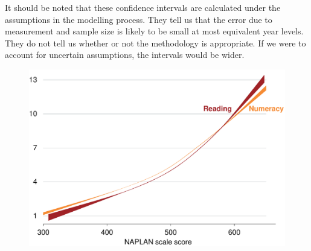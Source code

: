 It should be noted that these confidence intervals are calculated under the assumptions in the modelling process. They tell us that the error due to measurement and sample size is likely to be small at most equivalent year levels. They do not tell us whether or not the methodology is appropriate. If we were to account for uncertain assumptions, the intervals would be wider.

\begin{figure}[H]
 \includegraphics[width=\columnwidth]{atlas/CYL_CI.pdf}\label{fig:cyl_ci}

\end{figure}

